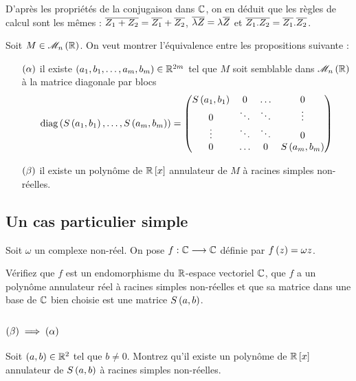D'après les propriétés de la conjugaison dans \(\mathbb{C}\), on en déduit que les règles de calcul sont les mêmes : \(\overline{Z_1+Z_2}=\overline{Z_1}+\overline{Z_2}\), \(\overline{\lambda Z}=\lambda\overline{Z}\) et \(\overline{Z_1.Z_2}=\overline{Z_1}.\overline{Z_2}\).

Soit \(M\in\M{n}[\R]\). On veut montrer l'équivalence entre les propositions suivante :

\begin{enumerate}
    \item[\(\left(\alpha\right)\)] il existe \(\left(a_1,b_1,\dots,a_m,b_m\right)\in\mathbb{R}^{2m}\) tel que \(M\) soit semblable dans \(\M{n}[\R]\) à la matrice diagonale par blocs \[\operatorname{diag}\left(S\left(a_1,b_1\right),\dots,S\left(a_m,b_m\right)\right)=\begin{pmatrix}
        S\left(a_1,b_1\right) & 0 & \dots & 0 \\
        0 & \ddots & \ddots & \vdots \\
        \vdots & \ddots & \ddots & 0 \\
        0 & \dots & 0 & S\left(a_m,b_m\right)
    \end{pmatrix}\]
    \item[\(\left(\beta\right)\)] il existe un polynôme de \(\poly[\R][x]\) annulateur de \(M\) à racines simples non-réelles.
\end{enumerate}

\subsection*{Un cas particulier simple}

Soit \(\omega\) un complexe non-réel. On pose \(f:\mathbb{C}\longrightarrow\mathbb{C}\) définie par \(f\left(z\right)=\omega z\).

Vérifiez que \(f\) est un endomorphisme du \(\mathbb{R}\)-espace vectoriel \(\mathbb{C}\), que \(f\) a un polynôme annulateur réel à racines simples non-réelles et que sa matrice dans une base de \(\mathbb{C}\) bien choisie est une matrice \(S\left(a,b\right)\).



\subsection*{\(\left(\beta\right)\implies\left(\alpha\right)\)}

\begin{q}
Soit \(\left(a,b\right)\in\mathbb{R}^2\) tel que \(b\not=0\). Montrez qu'il existe un polynôme de \(\poly[\R][x]\) annulateur de \(S\left(a,b\right)\) à racines simples non-réelles.
\end{q}



